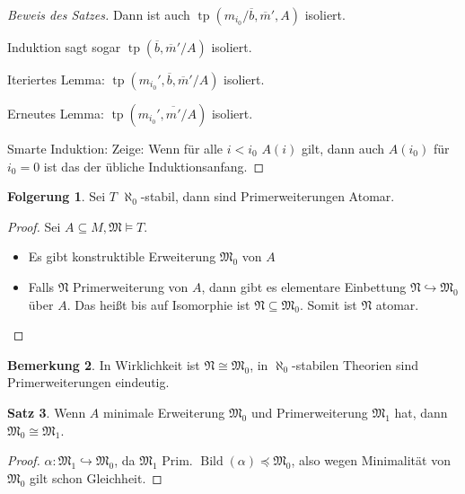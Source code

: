 \documentclass[12pt,parskip=full]{scrartcl}
\theoremstyle{definition}
\newtheorem{theorem}{Satz}[section]
\newtheorem{corollary}[theorem]{Folgerung}
\newtheorem{remark}[theorem]{Bemerkung}
\begin{document}
\begin{proof}[Beweis des Satzes]
 		Dann ist auch $\operatorname{tp}(m_{i_0}/\overline{b}, \overline{m}', A)$ isoliert.
 		
 		Induktion sagt sogar $\operatorname{tp}(\overline{b}, \overline{m}' / A)$ isoliert.
 		
 		Iteriertes Lemma: $\operatorname{tp}(m_{i_0}', \overline{b}, \overline{m}' / A)$ isoliert.
 		
 		Erneutes Lemma: $\operatorname{tp}(m_{i_0}', \overline{m'} / A)$ isoliert.
 		
 		Smarte Induktion: Zeige: Wenn für alle $i < i_0$ $A(i)$ gilt, dann auch $A(i_0)$ für $i_0 = 0$ ist das der übliche Induktionsanfang.
 	\end{proof}
 
 	\begin{corollary}
 		Sei $T$ $\aleph_0$-stabil, dann sind Primerweiterungen Atomar.
 	\end{corollary}
 
 	\begin{proof}
 		Sei $A \subseteq M, \mathfrak{M} \models T$.
 		
 		\begin{itemize}
 			\item Es gibt konstruktible Erweiterung $\mathfrak{M}_0$ von $A$
 			\item Falls $\mathfrak{N}$ Primerweiterung von $A$, dann gibt es elementare Einbettung $\mathfrak{N} \hookrightarrow \mathfrak{M}_0$ über $A$. Das heißt bis auf Isomorphie ist $\mathfrak{N} \subseteq \mathfrak{M}_0$. Somit ist $\mathfrak{N}$ atomar.
 		\end{itemize}
 	\end{proof}
 
 	\begin{remark}
 		In Wirklichkeit ist $\mathfrak{N} \cong \mathfrak{M}_0$, in $\aleph_0$-stabilen Theorien sind Primerweiterungen eindeutig.
 	\end{remark}
 
 	\begin{theorem}
 		Wenn $A$ minimale Erweiterung $\mathfrak{M}_0$ und Primerweiterung $\mathfrak{M}_1$ hat, dann $\mathfrak{M}_0 \cong \mathfrak{M}_1$.
 	\end{theorem}
 
 	\begin{proof}
 		$\alpha: \mathfrak{M}_1 \hookrightarrow \mathfrak{M}_0$, da $\mathfrak{M}_1$ Prim. $\operatorname{Bild}(\alpha) \preccurlyeq \mathfrak{M}_0$, also wegen Minimalität von $\mathfrak{M}_0$ gilt schon Gleichheit.
 	\end{proof}
 
\end{document}
